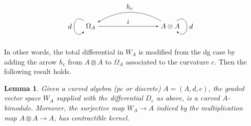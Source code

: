 \documentclass[a4paper]{amsart}
\theoremstyle{plain}
\newtheorem{lem}[thm]{Lemma}
\theoremstyle{definition}
\theoremstyle{remark}
\numberwithin{equation}{section}
\theoremstyle{plain}
\begin{document}
\[
\begin{tikzpicture}[>=stealth, baseline=(current bounding box.center)]
	\node (L) at (0,0) {$\Omega_A$};
	\node (R) at (4,0) {$A\otimes A$};
	
	\draw[->] (L) -- node[above] {$i$} (R);
	
	\draw[->] (R) to[out=150,in=30] node[above] {$h_c$}  (L);
	
	\draw[->]
	(L) .. controls +(-1,0.8) and +(-1,-0.8) ..
	node[left] {$d$} (L);
	
	\draw[->]
	(R) .. controls +(1,0.8) and +(1,-0.8) ..
	node[right] {$d$} (R);
\end{tikzpicture}
\]
In other words, the total differential 	in $W_A$ is modified from the dg case by adding the arrow  $h_c$ from $A\otimes A$ to $\Omega_A$ associated to the curvature $c$. Then the following result holds.
\begin{lem}\label{lem:curved}
	Given a curved algebra (pc or discrete) $A=(A,d,c)$, the graded vector space $W_A$ supplied with the differential $D_c$ as above, is a curved $A$-bimodule.	Moreover, the surjective map $W_A\to A$ indiced by the multiplication map $A\otimes A\to A$, has contractible kernel. 
\end{lem}
\end{document}
